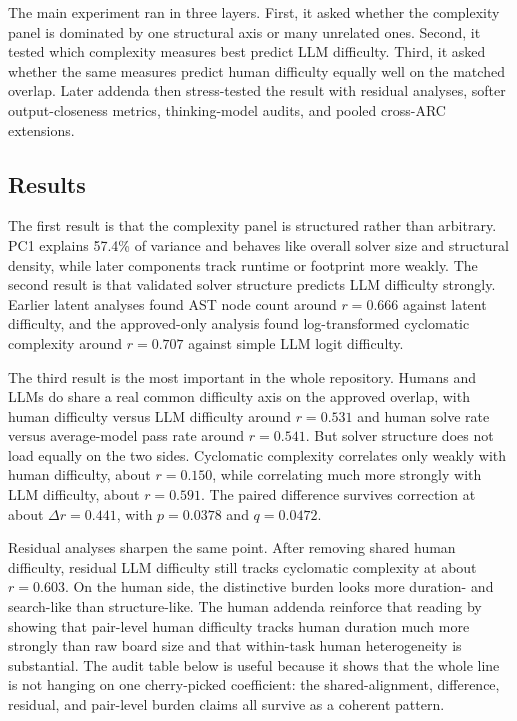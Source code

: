 \documentclass[11pt,letterpaper]{article}
\begin{document}
The main experiment ran in three layers. First, it asked whether the complexity panel is dominated by one structural axis or many unrelated ones. Second, it tested which complexity measures best predict LLM difficulty. Third, it asked whether the same measures predict human difficulty equally well on the matched overlap. Later addenda then stress-tested the result with residual analyses, softer output-closeness metrics, thinking-model audits, and pooled cross-ARC extensions.

\subsection{Results}

The first result is that the complexity panel is structured rather than arbitrary. PC1 explains 57.4\% of variance and behaves like overall solver size and structural density, while later components track runtime or footprint more weakly. The second result is that validated solver structure predicts LLM difficulty strongly. Earlier latent analyses found AST node count around $r = 0.666$ against latent difficulty, and the approved-only analysis found log-transformed cyclomatic complexity around $r = 0.707$ against simple LLM logit difficulty.

The third result is the most important in the whole repository. Humans and LLMs do share a real common difficulty axis on the approved overlap, with human difficulty versus LLM difficulty around $r = 0.531$ and human solve rate versus average-model pass rate around $r = 0.541$. But solver structure does not load equally on the two sides. Cyclomatic complexity correlates only weakly with human difficulty, about $r = 0.150$, while correlating much more strongly with LLM difficulty, about $r = 0.591$. The paired difference survives correction at about $\Delta r = 0.441$, with $p = 0.0378$ and $q = 0.0472$.

Residual analyses sharpen the same point. After removing shared human difficulty, residual LLM difficulty still tracks cyclomatic complexity at about $r = 0.603$. On the human side, the distinctive burden looks more duration- and search-like than structure-like. The human addenda reinforce that reading by showing that pair-level human difficulty tracks human duration much more strongly than raw board size and that within-task human heterogeneity is substantial. The audit table below is useful because it shows that the whole line is not hanging on one cherry-picked coefficient: the shared-alignment, difference, residual, and pair-level burden claims all survive as a coherent pattern.
\end{document}
